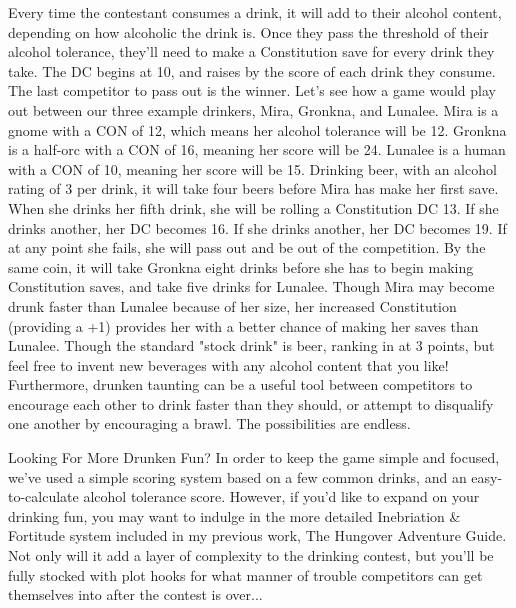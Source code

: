\documentclass[10pt,a4paper,twoside,twocolumn,openany,bg=print,nodeprecatedcode]{dndbook}
\begin{document}
Every time the contestant consumes a drink, it will add to their alcohol content, depending on how alcoholic the drink is. Once they pass the threshold of their alcohol tolerance, they'll need to make a Constitution save for every drink they take. The DC begins at 10, and raises by the score of each drink they consume. The last competitor to pass out is the winner.
Let's see how a game would play out between our three example drinkers, Mira, Gronkna, and Lunalee. Mira is a gnome with a CON of 12, which means her alcohol tolerance will be 12. Gronkna is a half-orc with a CON of 16, meaning her score will be 24. Lunalee is a human with a CON of 10, meaning her score will be 15.
Drinking beer, with an alcohol rating of 3 per drink, it will take four beers before Mira has make her first save. When she drinks her fifth drink, she will be rolling a Constitution DC 13. If she drinks another, her DC becomes 16. If she drinks another, her DC becomes 19. If at any point she fails, she will pass out and be out of the competition. By the same coin, it will take Gronkna eight drinks before she has to begin making Constitution saves, and take five drinks for Lunalee. Though Mira may become drunk faster than Lunalee because of her size, her increased Constitution (providing a +1) provides her with a better chance of making her saves than Lunalee.
Though the standard "stock drink" is beer, ranking in at 3 points, but feel free to invent new beverages with any alcohol content that you like! Furthermore, drunken taunting can be a useful tool between competitors to encourage each other to drink faster than they should, or attempt to disqualify one another by encouraging a brawl. The possibilities are endless.
\begin{DndComment}{Looking For More Drunken Fun?}
In order to keep the game simple and focused, we've used a simple scoring system based on a few common drinks, and an easy-to-calculate alcohol tolerance score. However, if you'd like to expand on your drinking fun, you may want to indulge in the more detailed Inebriation \& Fortitude system included in my previous work, The Hungover Adventure Guide. Not only will it add a layer of complexity to the drinking contest, but you'll be fully stocked with plot hooks for what manner of trouble competitors can get themselves into after the contest is over...
\end{DndComment}
\end{document}
